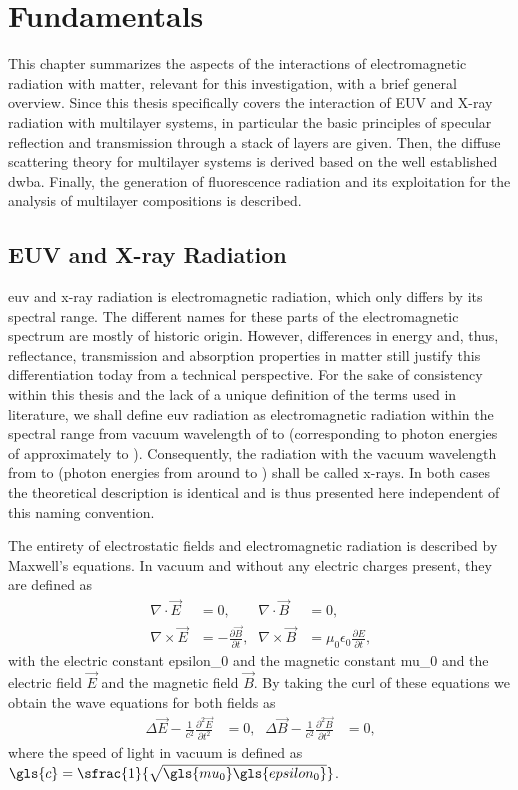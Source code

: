 \chapter{Fundamentals}
This chapter summarizes the aspects of the interactions of electromagnetic radiation with matter, relevant for this investigation, with a brief general overview. Since this thesis specifically covers the interaction of EUV and X-ray radiation with multilayer systems, in particular the basic principles of specular reflection and transmission through a stack of layers are given. Then, the diffuse scattering theory for multilayer systems is derived based on the well established \gls{dwba}. Finally, the generation of fluorescence radiation and its exploitation for the analysis of multilayer compositions is described.

\section{EUV and X-ray Radiation}
\Gls{euv} and x-ray radiation is electromagnetic radiation, which only differs by its spectral range. The different names for these parts of the electromagnetic spectrum are mostly of historic origin. However, differences in energy and, thus, reflectance, transmission and absorption properties in matter still justify this differentiation today from a technical perspective. For the sake of consistency within this thesis and the lack of a unique definition of the terms used in literature, we shall define \gls{euv} radiation as electromagnetic radiation within the spectral range from vacuum wavelength of  to  (corresponding to photon energies of approximately  to ). Consequently, the radiation with the vacuum wavelength from  to  (photon energies from around  to ) shall be called x-rays. In both cases the theoretical description is identical and is thus presented here independent of this naming convention.

The entirety of electrostatic fields and electromagnetic radiation is described by Maxwell's equations. In vacuum and without any electric charges present, they are defined as
\begin{align*}
\nabla \cdotp \vec{E} &=0 \text{,} & \nabla \cdotp \vec{B} &=0 \text{,}\\
\nabla \times \vec{E} & = -\frac{\partial \vec{B}}{\partial t}\text{,} & \nabla \times \vec{B} &= \mu_0 \epsilon_0 \frac{\partial E}{\partial t} \text{,}
\end{align*}
with the electric constant \gls{epsilon_0} and the magnetic constant \gls{mu_0} and the electric field $\vec{E}$ and the magnetic field $\vec{B}$. By taking the curl of these equations we obtain the wave equations for both fields as
\begin{align}
\Delta \vec{E} - \frac{1}{c^2} \frac{\partial^2 \vec{E}}{\partial t^2} &= 0\text{,}& \Delta \vec{B} - \frac{1}{c^2} \frac{\partial^2 \vec{B}}{\partial t^2} &= 0\text{,} \label{ch_theo:eqn_wave_equation_vacuum}
\end{align}
where the speed of light in vacuum is defined as $\gls{c} = \sfrac{1}{\sqrt{\gls{mu_0}\gls{epsilon_0}}}$.


